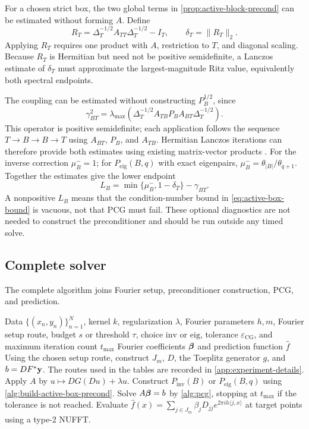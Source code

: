 For a chosen strict box, the two global terms in
\cref{prop:active-block-precond} can be estimated without forming \(A\). Define
\[
    R_T
    =\Delta_T^{-1/2}A_{TT}\Delta_T^{-1/2}-I_T,
    \qquad
    \delta_T=\|R_T\|_2.
\]
Applying \(R_T\) requires one product with \(A\), restriction to \(T\), and
diagonal scaling. Because \(R_T\) is Hermitian but need not be positive
semidefinite, a Lanczos estimate of \(\delta_T\) must approximate the
largest-magnitude Ritz value, equivalently both spectral endpoints.

The coupling can be estimated without constructing \(P_B^{1/2}\), since
\begin{equation}
    \gamma_{BT}^2
    =\lambda_{\max}\!\left(
        \Delta_T^{-1/2}A_{TB}P_BA_{BT}\Delta_T^{-1/2}
    \right).
    \label{eq:coupling-diagnostic-operator}
\end{equation}
This operator is positive semidefinite; each application follows the sequence
\(T\to B\to B\to T\) using \(A_{BT}\), \(P_B\), and \(A_{TB}\).
Hermitian Lanczos iterations can therefore provide both estimates using existing
matrix-vector products \cite{lanczos1950iteration,lehoucq1998arpack}. For the
inverse correction \(\mu_B^-=1\); for \(P_{\mathrm{eig}}(B,q)\) with exact
eigenpairs,
\(\mu_B^-=\theta_{|B|}/\theta_{q+1}\). Together the estimates give the lower
endpoint
\[
    L_B=\min\{\mu_B^-,1-\delta_T\}-\gamma_{BT}.
\]
A nonpositive \(L_B\) means that the condition-number bound in
\cref{eq:active-box-bound} is vacuous, not that PCG must fail. These optional
diagnostics are not needed to construct the preconditioner and should be run
outside any timed solve.

\subsection{Complete solver}

The complete algorithm joins Fourier setup, preconditioner construction, PCG,
and prediction.

\begin{algorithm}[H]
\caption{Fourier KRR with active-box preconditioning}
\begin{algorithmic}[1]
\Require Data \(\{(x_n,y_n)\}_{n=1}^N\), kernel \(k\), regularization
\(\lambda\), Fourier parameters \(h,m\), Fourier setup route, budget \(s\) or
threshold \(\tau\), choice \(\mathrm{inv}\) or \(\mathrm{eig}\), tolerance
\(\varepsilon_{\mathrm{CG}}\), and maximum iteration count \(t_{\max}\)
\Ensure Fourier coefficients \(\boldsymbol\beta\) and prediction function \(\widehat f\)
\State Using the chosen setup route, construct \(J_m\), \(D\), the Toeplitz
generator \(g\), and \(b=DF^*\mathbf y\). The routes used in the tables are recorded
in \cref{app:experiment-details}.
\State Apply \(A\) by \(u\mapsto DG(Du)+\lambda u\).
\State Construct \(P_{\mathrm{inv}}(B)\) or \(P_{\mathrm{eig}}(B,q)\) using
\cref{alg:build-active-box-precond}.
\State Solve \(A\boldsymbol\beta=b\) by \cref{alg:pcg}, stopping at
\(t_{\max}\) if the tolerance is not reached.
\State Evaluate
\(\widehat f(x)=\sum_{j\in J_m}\beta_jD_{jj}
e^{2\pi ih\langle j,x\rangle}\) at target points using a type-2 NUFFT.
\end{algorithmic}
\end{algorithm}
